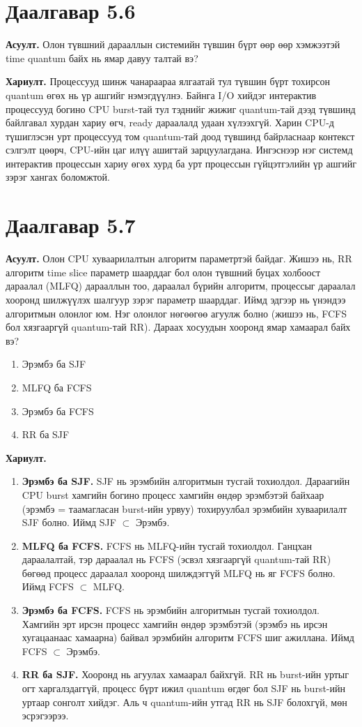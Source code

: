 \documentclass[12pt,a4paper]{article}
\newcommand{\q}[1]{\par\noindent\textbf{Асуулт.} #1\par}
\newcommand{\ans}{\par\noindent\textbf{Хариулт.} }
\begin{document}
\section{Даалгавар 5.6}
\q{Олон түвшний дарааллын системийн түвшин бүрт өөр өөр хэмжээтэй time quantum байх нь ямар давуу талтай вэ?}
\ans Процессууд шинж чанараараа ялгаатай тул түвшин бүрт тохирсон quantum өгөх нь үр ашгийг нэмэгдүүлнэ. Байнга I/O хийдэг интерактив процессууд богино CPU burst-тай тул тэднийг жижиг quantum-тай дээд түвшинд байлгавал хурдан хариу өгч, ready дараалалд удаан хүлээхгүй. Харин CPU-д түшиглэсэн урт процессууд том quantum-тай доод түвшинд байрласнаар контекст сэлгэлт цөөрч, CPU-ийн цаг илүү ашигтай зарцуулагдана. Ингэснээр нэг системд интерактив процессын хариу өгөх хурд ба урт процессын гүйцэтгэлийн үр ашгийг зэрэг хангах боломжтой.

\section{Даалгавар 5.7}
\q{Олон CPU хуваарилалтын алгоритм параметртэй байдаг. Жишээ нь, RR алгоритм time slice параметр шаарддаг бол олон түвшний буцах холбоост дараалал (MLFQ) дарааллын тоо, дараалал бүрийн алгоритм, процессыг дараалал хооронд шилжүүлэх шалгуур зэрэг параметр шаарддаг. Иймд эдгээр нь үнэндээ алгоритмын олонлог юм. Нэг олонлог нөгөөгөө агуулж болно (жишээ нь, FCFS бол хязгааргүй quantum-тай RR). Дараах хосуудын хооронд ямар хамаарал байх вэ?}
\begin{enumerate}[label=\alph*.,nosep]
\item Эрэмбэ ба SJF
\item MLFQ ба FCFS
\item Эрэмбэ ба FCFS
\item RR ба SJF
\end{enumerate}
\ans
\begin{enumerate}[label=\alph*.]
\item \textbf{Эрэмбэ ба SJF.} SJF нь эрэмбийн алгоритмын тусгай тохиолдол. Дараагийн CPU burst хамгийн богино процесс хамгийн өндөр эрэмбэтэй байхаар (эрэмбэ = таамагласан burst-ийн урвуу) тохируулбал эрэмбийн хуваарилалт SJF болно. Иймд SJF $\subset$ Эрэмбэ.
\item \textbf{MLFQ ба FCFS.} FCFS нь MLFQ-ийн тусгай тохиолдол. Ганцхан дараалалтай, тэр дараалал нь FCFS (эсвэл хязгааргүй quantum-тай RR) бөгөөд процесс дараалал хооронд шилждэггүй MLFQ нь яг FCFS болно. Иймд FCFS $\subset$ MLFQ.
\item \textbf{Эрэмбэ ба FCFS.} FCFS нь эрэмбийн алгоритмын тусгай тохиолдол. Хамгийн эрт ирсэн процесс хамгийн өндөр эрэмбэтэй (эрэмбэ нь ирсэн хугацаанаас хамаарна) байвал эрэмбийн алгоритм FCFS шиг ажиллана. Иймд FCFS $\subset$ Эрэмбэ.
\item \textbf{RR ба SJF.} Хооронд нь агуулах хамаарал байхгүй. RR нь burst-ийн уртыг огт харгалздаггүй, процесс бүрт ижил quantum өгдөг бол SJF нь burst-ийн уртаар сонголт хийдэг. Аль ч quantum-ийн утгад RR нь SJF болохгүй, мөн эсрэгээрээ.
\end{enumerate}
\end{document}
